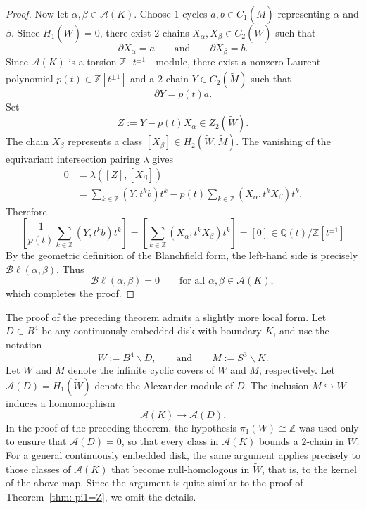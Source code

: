 \documentclass[a4paper, 11pt]{amsart}
\theoremstyle{definition}
\newcommand{\Bl}{\mathcal{B}\ell}
\newcommand{\pref}[1]{(\ref{#1})}
\begin{document}
\begin{proof}
Now let $\alpha,\beta \in \mathcal{A}(K)$. Choose $1$-cycles
$a,b \in C_1(\widetilde{M})$
representing $\alpha$ and $\beta$.
Since $H_1(\widetilde{W})=0$, there exist $2$-chains
$X_\alpha,X_\beta \in C_2(\widetilde{W})$ such that
\[
\partial X_\alpha=a
\qquad\text{and}\qquad
\partial X_\beta=b.
\]
Since $\mathcal{A}(K)$ is a torsion $\mathbb{Z}[t^{\pm 1}]$-module, there
exist a nonzero Laurent polynomial $p(t)\in\mathbb{Z}[t^{\pm 1}]$ and a
$2$-chain $Y\in C_2(\widetilde{M})$ such that
\[
\partial Y=p(t)a.
\]
Set
\[
Z:=Y-p(t)X_\alpha \in Z_2(\widetilde{W}).
\]
The chain $X_\beta$ represents a class
$[X_\beta]\in H_2(\widetilde{W},\widetilde{M})$. 
The vanishing of the
equivariant intersection pairing $\lambda$ gives
\begin{align*}
0
&= \lambda([Z],[X_\beta]) \\
&= \sum_{k\in\mathbb{Z}} (Y,t^k b)t^k
   - p(t)\sum_{k\in\mathbb{Z}} (X_\alpha,t^k X_\beta)t^k.
\end{align*}
Therefore
\[
\left[
\frac{1}{p(t)}
\sum_{k\in\mathbb{Z}} (Y,t^k b)t^k
\right]
=
\left[
\sum_{k\in\mathbb{Z}} (X_\alpha,t^k X_\beta)t^k
\right]
=[0]\in \mathbb{Q}(t)/\mathbb{Z}[t^{\pm 1}]
\]
By the geometric definition of the
Blanchfield form, the left-hand side is precisely $\Bl(\alpha,\beta)$.
Thus
\[
\Bl(\alpha,\beta)=0
\qquad\text{for all }
\alpha,\beta \in \mathcal{A}(K),
\]
which completes the proof.
\end{proof}




The proof of the preceding theorem admits a slightly more local form.
Let \(D\subset B^4\) be any continuously embedded disk with boundary \(K\), and use the notation
\[
    W:=B^4\smallsetminus D,
    \qquad\text{and}\qquad
    M:=S^3\smallsetminus K.
\]
Let \(\widetilde W\) and \(\widetilde M\) denote the infinite cyclic covers of \(W\) and \(M\), respectively. Let $\mathcal{A}(D)=H_1(\widetilde W)$
denote the Alexander module of \(D\). The inclusion \(M\hookrightarrow W\) induces a homomorphism
\[
    \mathcal{A}(K)
    \longrightarrow
    \mathcal{A}(D).
\]
In the proof of the preceding theorem, the hypothesis
\(\pi_1(W)\cong \mathbb Z\) was used only to ensure that
\(\mathcal{A}(D)=0\), so that every class in \(\mathcal{A}(K)\) bounds a
\(2\)-chain in \(\widetilde W\). For a general continuously embedded disk,
the same argument applies precisely to those classes of \(\mathcal{A}(K)\)
that become null-homologous in \(\widetilde W\), that is, to the kernel of the above map. Since the argument is quite similar to the proof of Theorem~\ref{thm: pi1=Z}, we omit the details.
\end{document}
